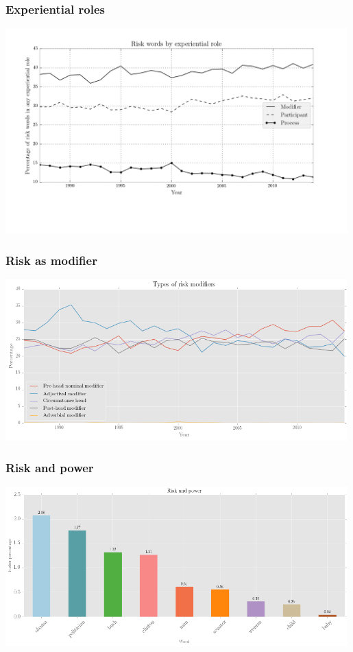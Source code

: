\documentclass{beamer}       %
\begin{document}
\begin{frame}
    \frametitle{Experiential roles}
    \centering
    \includegraphics[width=0.99\textwidth]{../images/ppmfinal}
\end{frame}

\begin{frame}
    \frametitle{Risk as modifier}
    \centering
    \includegraphics[width=0.99\textwidth]{../images/types-of-risk-modifiers}
\end{frame}

\begin{frame}
    \frametitle{Risk and power}
    \centering
    \includegraphics[width=0.99\textwidth]{../images/risk-and-power-2}
\end{frame}
\end{document}

